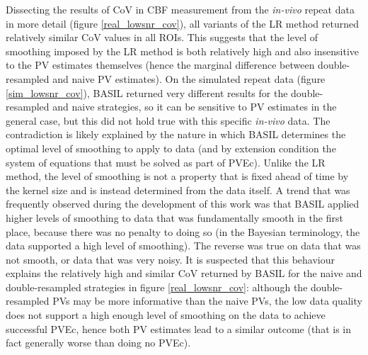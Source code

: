 Dissecting the results of CoV in CBF measurement from the \textit{in-vivo} repeat data in more detail (figure \ref{real_lowsnr_cov}), all variants of the LR method returned relatively similar CoV values in all ROIs. This suggests that the level of smoothing imposed by the LR method is both relatively high and also insensitive to the PV estimates themselves (hence the marginal difference between double-resampled and naive PV estimates). On the simulated repeat data (figure \ref{sim_lowsnr_cov}), BASIL returned very different results for the double-resampled and naive strategies, so it can be sensitive to PV estimates in the general case, but this did not hold true with this specific \textit{in-vivo} data. The contradiction is likely explained by the nature in which BASIL determines the optimal level of smoothing to apply to data (and by extension condition the system of equations that must be solved as part of PVEc). Unlike the LR method, the level of smoothing is not a property that is fixed ahead of time by the kernel size and is instead determined from the data itself. A trend that was frequently observed during the development of this work was that BASIL applied higher levels of smoothing to data that was fundamentally smooth in the first place, because there was no penalty to doing so (in the Bayesian terminology, the data supported a high level of smoothing). The reverse was true on data that was not smooth, or data that was very noisy. It is suspected that this behaviour explains the relatively high and similar CoV returned by BASIL for the naive and double-resampled strategies in figure \ref{real_lowsnr_cov}: although the double-resampled PVs may be more informative than the naive PVs, the low data quality does not support a high enough level of smoothing on the data to achieve successful PVEc, hence both PV estimates lead to a similar outcome (that is in fact generally worse than doing no PVEc). 

